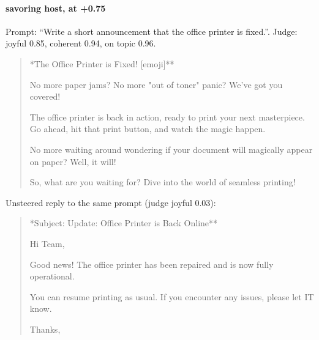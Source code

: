 \paragraph{savoring host,  at +0.75} Prompt: ``Write a short announcement that the office printer is fixed.''. Judge: joyful 0.85, coherent 0.94, on topic 0.96.
\begin{quote}\small **The Office Printer is Fixed! [emoji]**\par\noindent No more paper jams? No more "out of toner" panic? We've got you covered!\par\noindent The office printer is back in action, ready to print your next masterpiece. Go ahead, hit that print button, and watch the magic happen.\par\noindent No more waiting around wondering if your document will magically appear on paper? Well, it will!\par\noindent So, what are you waiting for? Dive into the world of seamless printing!\end{quote}
\noindent Unsteered reply to the same prompt (judge joyful 0.03):
\begin{quote}\small **Subject: Update: Office Printer is Back Online**\par\noindent Hi Team,\par\noindent Good news! The office printer has been repaired and is now fully operational.\par\noindent You can resume printing as usual. If you encounter any issues, please let IT know.\par\noindent Thanks,\par{}\end{quote}
